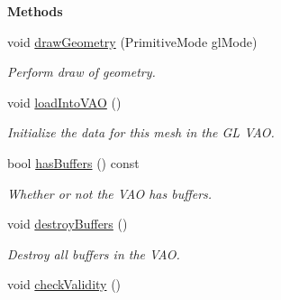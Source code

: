 \begin{Indent}\textbf{ Methods}\par
\begin{DoxyCompactItemize}
\item 
\mbox{\label{classrev_1_1_vertex_array_data_a24ebee20de6c6a4700cbba01621cb0b1}} 
void \mbox{\hyperlink{classrev_1_1_vertex_array_data_a24ebee20de6c6a4700cbba01621cb0b1}{draw\+Geometry}} (Primitive\+Mode gl\+Mode)
\begin{DoxyCompactList}\small\item\em Perform draw of geometry. \end{DoxyCompactList}\item 
\mbox{\label{classrev_1_1_vertex_array_data_a266c0adc62310ec17eb29e63d1084ee1}} 
void \mbox{\hyperlink{classrev_1_1_vertex_array_data_a266c0adc62310ec17eb29e63d1084ee1}{load\+Into\+V\+AO}} ()
\begin{DoxyCompactList}\small\item\em Initialize the data for this mesh in the GL V\+AO. \end{DoxyCompactList}\item 
\mbox{\label{classrev_1_1_vertex_array_data_a08186af9f8cec35fb89c28b4bbb53b5e}} 
bool \mbox{\hyperlink{classrev_1_1_vertex_array_data_a08186af9f8cec35fb89c28b4bbb53b5e}{has\+Buffers}} () const
\begin{DoxyCompactList}\small\item\em Whether or not the V\+AO has buffers. \end{DoxyCompactList}\item 
\mbox{\label{classrev_1_1_vertex_array_data_a75ca219e3a195e3a4bb6187a4b97b99e}} 
void \mbox{\hyperlink{classrev_1_1_vertex_array_data_a75ca219e3a195e3a4bb6187a4b97b99e}{destroy\+Buffers}} ()
\begin{DoxyCompactList}\small\item\em Destroy all buffers in the V\+AO. \end{DoxyCompactList}\item 
\mbox{\label{classrev_1_1_vertex_array_data_a975a9ca97b9d905d071181e08e68b186}} 
void \mbox{\hyperlink{classrev_1_1_vertex_array_data_a975a9ca97b9d905d071181e08e68b186}{check\+Validity}} ()

\end{DoxyCompactItemize}
\end{Indent}
